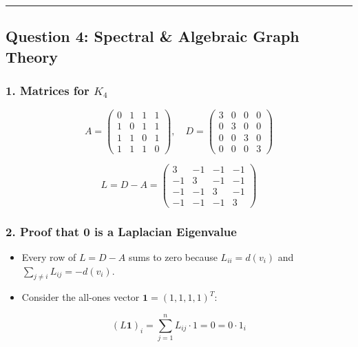 \documentclass[
]{book}
\providecommand{\tightlist}{%
  \setlength{\itemsep}{0pt}\setlength{\parskip}{0pt}}
\theoremstyle{definition}
\theoremstyle{definition}
\theoremstyle{definition}
\theoremstyle{definition}
\theoremstyle{remark}
\begin{document}
\begin{center}\rule{0.5\linewidth}{0.5pt}\end{center}

\subsection{Question 4: Spectral \& Algebraic Graph Theory}\label{question-4-spectral-algebraic-graph-theory}

\subsubsection{\texorpdfstring{1. Matrices for \(K_4\)}{1. Matrices for K\_4}}\label{matrices-for-k_4}

\[A = \begin{pmatrix} 0 & 1 & 1 & 1 \\ 1 & 0 & 1 & 1 \\ 1 & 1 & 0 & 1 \\ 1 & 1 & 1 & 0 \end{pmatrix}, \quad  D = \begin{pmatrix} 3 & 0 & 0 & 0 \\ 0 & 3 & 0 & 0 \\ 0 & 0 & 3 & 0 \\ 0 & 0 & 0 & 3 \end{pmatrix}\]

\[L = D - A = \begin{pmatrix} 3 & -1 & -1 & -1 \\ -1 & 3 & -1 & -1 \\ -1 & -1 & 3 & -1 \\ -1 & -1 & -1 & 3 \end{pmatrix}\]

\subsubsection{2. Proof that 0 is a Laplacian Eigenvalue}\label{proof-that-0-is-a-laplacian-eigenvalue}

\begin{itemize}
\tightlist
\item
  Every row of \(L = D - A\) sums to zero because \(L_{ii} = d(v_i)\) and \(\sum_{j \neq i} L_{ij} = -d(v_i)\).
\item
  Consider the all-ones vector \(\mathbf{1} = (1, 1, 1, 1)^T\):
\end{itemize}

\[(L \mathbf{1})_i = \sum_{j=1}^n L_{ij} \cdot 1 = 0 = 0 \cdot 1_i\]
\end{document}
